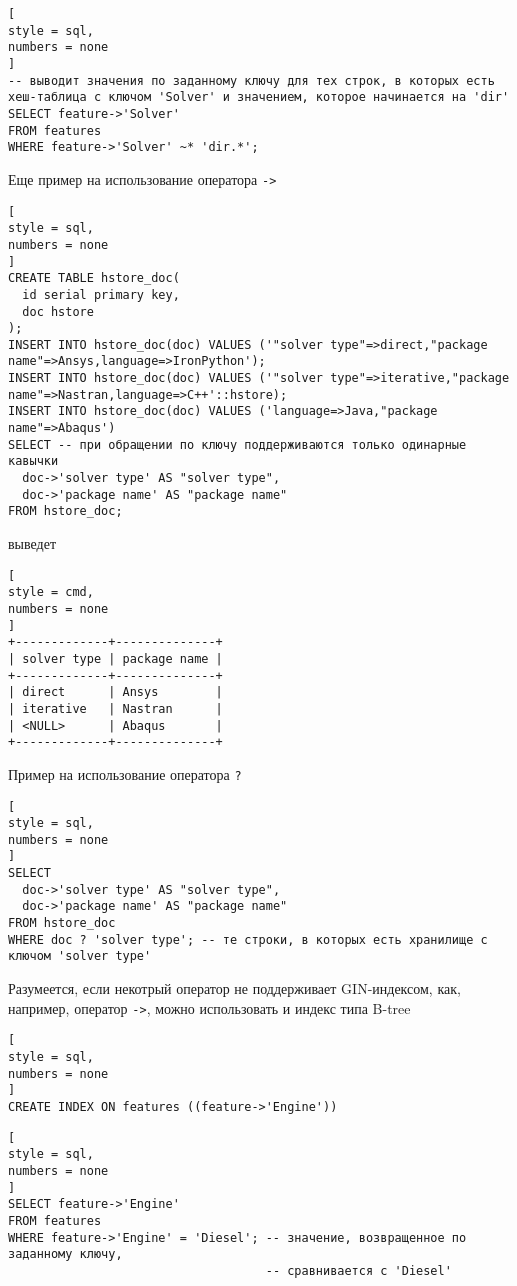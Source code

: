 \documentclass[%
	11pt,
	a4paper,
	utf8,
		]{article}
\begin{document}
\begin{lstlisting}[
style = sql,
numbers = none
]
-- выводит значения по заданному ключу для тех строк, в которых есть хеш-таблица с ключом 'Solver' и значением, которое начинается на 'dir'
SELECT feature->'Solver'
FROM features
WHERE feature->'Solver' ~* 'dir.*';
\end{lstlisting}

Еще пример на использование оператора \verb|->|
\begin{lstlisting}[
style = sql,
numbers = none
]
CREATE TABLE hstore_doc(
  id serial primary key,
  doc hstore
);
INSERT INTO hstore_doc(doc) VALUES ('"solver type"=>direct,"package name"=>Ansys,language=>IronPython');
INSERT INTO hstore_doc(doc) VALUES ('"solver type"=>iterative,"package name"=>Nastran,language=>C++'::hstore);
INSERT INTO hstore_doc(doc) VALUES ('language=>Java,"package name"=>Abaqus')
SELECT -- при обращении по ключу поддерживаются только одинарные кавычки
  doc->'solver type' AS "solver type",
  doc->'package name' AS "package name"
FROM hstore_doc;
\end{lstlisting}
выведет
\begin{lstlisting}[
style = cmd,
numbers = none
]
+-------------+--------------+
| solver type | package name |
+-------------+--------------+
| direct      | Ansys        |
| iterative   | Nastran      |
| <NULL>      | Abaqus       |
+-------------+--------------+
\end{lstlisting}

Пример на использование оператора \verb|?|
\begin{lstlisting}[
style = sql,
numbers = none
]
SELECT
  doc->'solver type' AS "solver type",
  doc->'package name' AS "package name"
FROM hstore_doc
WHERE doc ? 'solver type'; -- те строки, в которых есть хранилище с ключом 'solver type'
\end{lstlisting}




Разумеется, если некотрый оператор не поддерживает GIN-индексом, как, например, оператор \verb|->|, можно использовать и индекс типа B-tree
\begin{lstlisting}[
style = sql,
numbers = none
]
CREATE INDEX ON features ((feature->'Engine'))
\end{lstlisting}

\begin{lstlisting}[
style = sql,
numbers = none
]
SELECT feature->'Engine'
FROM features
WHERE feature->'Engine' = 'Diesel'; -- значение, возвращенное по заданному ключу,
                                    -- сравнивается с 'Diesel'
\end{lstlisting}
\end{document}
